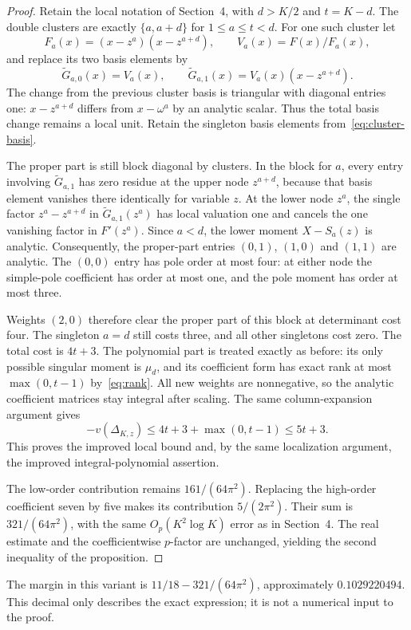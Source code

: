 \documentclass[11pt]{article}
\theoremstyle{remark}
\begin{document}
\begin{proof}
Retain the local notation of Section~4, with $d>K/2$ and $t=K-d$.
The double clusters are exactly $\{a,a+d\}$ for $1\le a\le t<d$.
For one such cluster let
\[
 F_a(x)=(x-z^a)(x-z^{a+d}),\qquad V_a(x)=F(x)/F_a(x),
\]
and replace its two basis elements by
\[
 \widetilde G_{a,0}(x)=V_a(x),\qquad
 \widetilde G_{a,1}(x)=V_a(x)(x-z^{a+d}).
\]
The change from the previous cluster basis is triangular with diagonal
entries one: $x-z^{a+d}$ differs from $x-\omega^a$ by an analytic
scalar. Thus the total basis change remains a local unit. Retain the
singleton basis elements from~\eqref{eq:cluster-basis}.

The proper part is still block diagonal by clusters. In the block
for $a$, every entry involving $\widetilde G_{a,1}$ has zero residue
at the upper node $z^{a+d}$, because that basis element vanishes
there identically for variable $z$. At the lower node $z^a$, the
single factor $z^a-z^{a+d}$ in $\widetilde G_{a,1}(z^a)$ has local
valuation one and cancels the one vanishing factor in $F'(z^a)$.
Since $a<d$, the lower moment $X-S_a(z)$ is analytic.
Consequently, the proper-part entries $(0,1)$, $(1,0)$ and $(1,1)$
are analytic. The $(0,0)$ entry has pole order at most four: at
either node the simple-pole coefficient has order at most one,
and the pole moment has order at most three.

Weights $(2,0)$ therefore clear the proper part of this block at
determinant cost four. The singleton $a=d$ still costs three, and
all other singletons cost zero. The total cost is $4t+3$.
The polynomial part is treated exactly as before: its only possible
singular moment is $\mu_d$, and its coefficient form has exact rank
at most $\max(0,t-1)$ by~\eqref{eq:rank}. All new weights are
nonnegative, so the analytic coefficient matrices stay integral after
scaling. The same column-expansion argument gives
\[
 -v(\Delta_{K,z})\le4t+3+\max(0,t-1)\le5t+3.
\]
This proves the improved local bound and, by the same localization
argument, the improved integral-polynomial assertion.

The low-order contribution remains $161/(64\pi^2)$. Replacing the
high-order coefficient seven by five makes its contribution
$5/(2\pi^2)$. Their sum is $321/(64\pi^2)$, with the same
$O_p(K^2\log K)$ error as in Section~4. The real estimate and
the coefficientwise $p$-factor are unchanged, yielding the second
inequality of the proposition.
\end{proof}

The margin in this variant is
$11/18-321/(64\pi^2)$, approximately $0.1029220494$.
This decimal only describes the exact expression; it is not a
numerical input to the proof.
\end{document}
